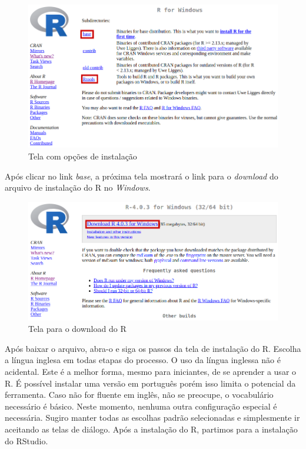 \documentclass[
  11pt,
]{book}
\begin{document}
\begin{figure}[!htbp]

{\centering \includegraphics[width=1\linewidth]{00-text-resources/figs/website_cran_4} 

}

\caption{Tela com opções de instalação}\label{fig:website-cran-4}
\end{figure}

Após clicar no link \emph{base}, a próxima tela mostrará o link para o \emph{download} do arquivo de instalação do R no \emph{Windows}.

\begin{figure}[!htbp]

{\centering \includegraphics[width=1\linewidth]{00-text-resources/figs/website_cran_5} 

}

\caption{Tela para o download do R}\label{fig:website-cran-5}
\end{figure}

Após baixar o arquivo, abra-o e siga os passos da tela de instalação do R. Escolha a língua inglesa em todas etapas do processo. O uso da língua inglessa não é acidental. Este é a melhor forma, mesmo para iniciantes, de se aprender a usar o R. É possível instalar uma versão em português porém isso limita o potencial da ferramenta. Caso não for fluente em inglês, não se preocupe, o vocabulário necessário é básico. Neste momento, nenhuma outra configuração especial é necessária. Sugiro manter todas as escolhas padrão selecionadas e simplesmente ir aceitando as telas de diálogo. Após a instalação do R, partimos para a instalação do RStudio.
\end{document}

